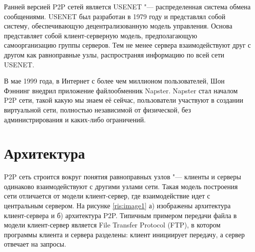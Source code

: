 \documentclass[bachelor, och, coursework]{SCWorks}
\begin{document}
Ранней версией P2P сетей является USENET "--- распределенная система обмена сообщениями. USENET 
был разработан в 1979 году и представлял собой систему, обеспечивающую децентрализованную модель управления. 
Основа представляет собой клиент-серверную модель, предполагающую самоорганизацию группы серверов. 
Тем не менее сервера взаимодействуют друг с другом как равноправные узлы, распространяя информацию по всей сети USENET.

В мае 1999 года, в Интернет с более чем миллионом пользователей, Шон Фэннинг внедрил приложение файлообменник Napster. 
Napster стал началом P2P сети, такой какую мы знаем её сейчас, пользователи участвуют в создании виртуальной сети, 
полностью независимой от физической, без администрирования и каких-либо ограничений.

\section{Архитектура} %
P2P сеть строится вокруг понятия равноправных узлов "--- клиенты и серверы одинаково взаимодействуют с другими узлами сети. 
Такая модель построения сети отличается от модели клиент-сервер, где взаимодействие идет с центральным сервером. 
На рисунке \ref{ris:image1} а) изображены архитектура клиент-сервера и б) архитектура P2P. 
Типичным примером передачи файла в модели клиент-сервер является File Transfer Protocol (FTP), 
в котором программы клиента и сервера разделены: клиент инициирует передачу, а сервер отвечает на запросы. 
\end{document}
